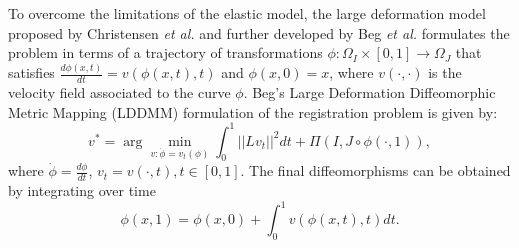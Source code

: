 To overcome the limitations of the elastic model, the large deformation model proposed by Christensen {\it et al.} \cite{Christensen2001} and further developed by Beg {\it et al.} \cite{Science2005} formulates the problem in terms of a trajectory of transformations \hbox{$\phi:\Omega_{I} \times [0, 1] \rightarrow \Omega_{J}$} that satisfies $\frac{d \phi(x, t)}{dt} = v(\phi(x, t), t)$ and $\phi(x, 0) = x$, where $v(\cdot, \cdot)$ is the velocity field associated to the curve $\phi$. Beg's Large Deformation Diffeomorphic Metric Mapping (LDDMM) \citep{Science2005} formulation of the registration problem is given by:
\begin{equation}\label{eq:LDDMM}
    v^{*} = \arg \min_{v:\dot{\phi} = v_{t}(\phi)} \int_{0}^{1} ||L v_{t}||^{2} dt + \Pi(I, J \circ \phi(\cdot, 1)),
\end{equation}
where $\dot{\phi} = \frac{d\phi}{dt}$, $v_{t} = v(\cdot, t), t\in [0, 1]$. The final diffeomorphisms can be obtained by integrating over time
\begin{equation}\label{eq:velocity_integral}
    \phi(x, 1) = \phi(x, 0) + \int_{0}^{1}v(\phi(x, t), t) dt.
\end{equation}

